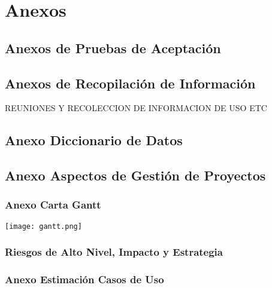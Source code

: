 \chapter{Anexos}

\section{Anexos de Pruebas de Aceptación}

\section{Anexos de Recopilación de Información}
REUNIONES Y RECOLECCION DE INFORMACION DE USO ETC

\section{Anexo Diccionario de Datos}

\section{Anexo Aspectos de Gestión de Proyectos}

\subsection{Anexo Carta Gantt}

\texttt{[image: gantt.png]}

\subsection{Riesgos de Alto Nivel, Impacto y Estrategia}

\subsection{Anexo Estimación Casos de Uso}

